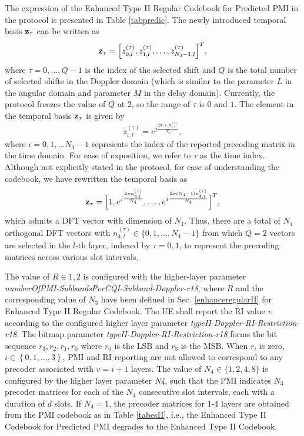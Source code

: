 \documentclass[lettersize,journal]{IEEEtran}
\begin{document}
The expression of the Enhanced Type II Regular Codebook for Predicted PMI in the protocol is presented in Table \ref{tabpredic}. The newly introduced temporal basis ${{\bf{z}}_{\tau}}$ can be written as
\begin{equation}
{{\bf{z}}_{\tau}} = {\left[ {z_{0,l}^{({\tau})},z_{1,l}^{({\tau})},\ldots,z_{{N_4} - 1,l}^{({\tau})}} \right]^T},   
\end{equation}
where $\tau=0,\ldots,Q-1$ is the index of the selected shift and $Q$ is the total number of selected shifts in the Doppler domain (which is similar to the parameter $L$ in the angular domain and parameter $M$ in the delay domain).  Currently, the protocol freezes the value of $Q$ at $2$, so the range of $\tau$ is $0$ and $1$. The element in the temporal basis ${{\bf{z}}_{\tau}}$ is given by 
\begin{equation}\label{b87}
z_{\iota,l}^{(\tau)}=e^{j\frac{2\pi\cdot\iota\cdot n_{4,l}^{(\tau)}}{N_4}},
\end{equation}
where $\iota=0,1,\ldots N_4-1$ represents the index of the reported precoding matrix in the time domain. For ease of exposition, we refer to $\tau$ as the time index. Although not explicitly stated in the protocol, for ease of understanding the codebook, we have rewritten the temporal basis as 
\begin{equation}\label{b88}
{{\bf{z}}_{\tau}} = {\Big[ {1,e^{j\frac{2\pi n_{4,l}^{(\tau)}}{N_4}},\ldots,{e^{j\frac{{2\pi ({N_4} - 1)n_{4,l}^{(\tau)}}}{{{N_4}}}}}} \Big]^T},    
\end{equation}
which admits a DFT vector with dimension of $N_4$. Thus, there are a total of $N_4$ orthogonal DFT vectors with $n_{4,l}^{(\tau)} \in \{0,1,\ldots,N_4-1\}$ from which $Q=2$ vectors are selected in the $l$-th layer, indexed by $\tau=0,1$, to represent the precoding matrices across various slot intervals. 

The value of $R\in{1,2}$ is configured with the higher-layer parameter \emph{numberOfPMI-SubbandsPerCQI-Subband-Doppler-r18}, where $R$ and the corresponding value of $N_3$ have been defined in Sec. \ref{enhanceregularII} for Enhanced Type II Regular Codebook. The UE shall report the RI value $\upsilon$ according to the configured higher layer parameter \emph{typeII-Doppler-RI-Restriction-r18}. The bitmap parameter \emph{typeII-Doppler-RI-Restriction-r18} forms the bit sequence $r_3,r_2,r_1,r_0$ where $r_0$ is the LSB and $r_3$ is the MSB. When $r_i$ is zero, $i\in\left\{0,1,\ldots,3\right\}$, PMI and RI reporting are not allowed to correspond to any precoder associated with $v=i+1$ layers. The value of $N_4\in \{1,2,4,8\}$ is configured by the higher layer parameter \emph{N4}, such that the PMI indicates $N_3$ precoder matrices for each of the $N_4$ consecutive slot intervals, each with a duration of $d$ slots. If $N_4=1$, the precoder matrices for 1-4 layers are obtained from the PMI codebook as in Table \ref{tabesII}, i.e., the Enhanced Type II Codebook for Predicted PMI degrades to the Enhanced Type II Codebook. 
\end{document}
